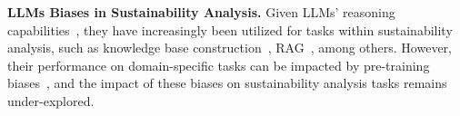 \noindent \textbf{LLMs Biases in Sustainability Analysis.}
Given LLMs' reasoning capabilities~\cite{wei2022emergent}, they have increasingly been utilized for tasks within sustainability analysis, such as knowledge base construction~\cite{ong2025esgsenticnet}, RAG~\cite{esgrevealrag}, among others. However, their performance on domain-specific tasks can be impacted by pre-training biases~\cite{dai2024llmbiassurvey, yang2024mitigating}, and the impact of these biases on sustainability analysis tasks remains under-explored.